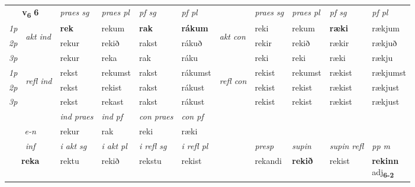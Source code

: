 \noindent
\begin{tabular}{lllllllllll} \toprule
\multicolumn{2}{c}{\textbf{v{\textsubscript{6}}} \Large{\textbf{6}}}  &  \textit{praes sg}  & \textit{praes pl}  &\textit{ pf sg} & \textit{pf pl} &  &  \textit{praes sg}  & \textit{praes pl}  & \textit{pf sg} & \textit{pf pl } \\*
	\cmidrule{3-6} \cmidrule{8-11}
 {\textit{1p}} & \multirow{3}{*}{\begin{turn}{90}\textit{akt ind}\end{turn}} & \textbf{rek} & rekum & \textbf{rak} & \textbf{rákum} & \multirow{3}{*}{\begin{turn}{90}\textit{akt con}\end{turn}} &reki & rekum & \textbf{ræki} & rækjum\\*
 {\textit{2p}} &  &  rekur  & rekið & rakst & rákuð & & rekir & rekið & rækir & rækjuð \\*
{\textit{3p}} &  & rekur & reka & rak & ráku & & reki & reki& ræki & rækju \\*
\cmidrule{3-6} \cmidrule{8-11}
 {\textit{1p}} & \multirow{3}{*}{\begin{turn}{90}\textit{refl ind}\end{turn}}  & rekst & rekumst & rakst & rákumst & \multirow{3}{*}{\begin{turn}{90}\textit{refl con}\end{turn}}  &rekist & rekumst & rækist & rækjumst \\*
 {\textit{2p}} &  & rekst & rekist & rakst & rákust & &rekist & rekist & rækist & rækjust \\*
 {\textit{3p}}  & & rekst & rekast & rakst & rákust & & rekist & rekist& rækist & rækjust \\*
\cmidrule{3-6} \cmidrule{8-11}

   & &  \textit{ind praes} & \textit{ind pf} & \textit{con praes} & \textit{con pf} \\*
\multicolumn{2}{c}{ \textit{e-n} } & rekur & rak & reki & ræki \\*

\cmidrule{3-11}
   \multicolumn{2}{c}{\textit{inf}}  & \textit{i akt sg} & \textit{i akt pl} & \textit{i refl sg} & \textit{i refl pl} && \textit{presp} & \textit{supin} & \textit{supin refl} & \textit{pp m} \\*
  \multicolumn{2}{c}{\textbf{reka}} & rektu  & rekið & rekstu & rekist && rekandi &  \textbf{rekið} & rekist & \specialcell{\textbf{rekinn} \\ adj\textbf{\textsubscript{6-2}}} \\*
\end{tabular}

